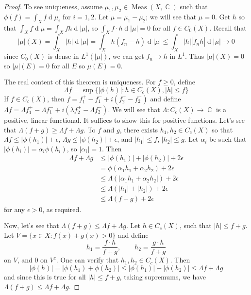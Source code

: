 \documentclass[12pt, a4paper]{book}
\DeclareMathOperator{\C}{\mathbb{C}}
\DeclareMathOperator{\Meas}{Meas}
\renewcommand{\d}[1]{\ensuremath{\operatorname{d}\!{#1}}} %
\theoremstyle{nonumberplain}
\newtheorem{proof}{Proof}
\begin{document}
\begin{proof}
    To see uniqueness, assume $\mu_1,\mu_2\in\Meas(X,\C)$ such that $\phi(f)=\int_X f\d{\mu_i}$ for $i=1,2$.
    Let $\mu=\mu_1-\mu_2$; we will see that $\mu=0$.
    Get $h$ so that $\int_Xf\d{\mu}=\int_X fh\d{|\mu|}$, so $\int_X f\cdot h\d{|\mu|}=0$ for all $f\in C_0(X)$.
    Recall that
    \[|\mu|(X)=\int_X|h|\d{|\mu|}=\int_X h(f_n-\overline{h})\d{|\mu|}\leq \int_X|h||f_n\overline{h}|\d{|\mu|}\to 0\]
    since $C_0(X)$ is dense in $L^1(|\mu|)$, we can get $f_n\to\overline{h}$ in $L^1$.
    Thus $|\mu|(X)=0$ so $|\mu|(E)=0$ for all $E$ so $\mu(E)=0$.

    The real content of this theorem is uniqueness.
    For $f\geq 0$, define
    \begin{equation*}
        \Lambda f=\sup\{|\phi(h)|:h\in C_c(X),|h|\leq f\}
    \end{equation*}
    If $f\in C_c(X)$, then $f=f_1^+-f_1^-+i(f_2^+-f_2^-)$ and define $\Lambda f=\Lambda f_1^+-\Lambda f_1^-+i\left(\lambda f_2^+-\Lambda f_2^-\right)$.
    We will see that $\Lambda:C_c(X)\to\C$ is a positive, linear functional.
    It suffices to show this for positive functions.
    Let's see that $\Lambda(f+g)\geq\Lambda f+\Lambda g$.
    To $f$ and $g$, there exists $h_1,h_2\in C_c(X)$ so that $\Lambda f\leq|\phi(h_1)|+\epsilon$, $\Lambda g\leq|\phi(h_2)|+\epsilon$, and $|h_1|\leq f$, $|h_2|\leq g$.
    Let $\alpha_i$ be such that $|\phi(h_i)|=\alpha_i\phi(h_i)$, so $|\alpha_i|=1$.
    Then
    \begin{align*}
        \Lambda f+\Lambda g &\leq |\phi(h_1)|+|\phi(h_2)|+2\epsilon\\
                            &= \phi(\alpha_1h_1+\alpha_2h_2)+2\epsilon\\
                            &\leq \Lambda(|\alpha_1h_1+\alpha_2h_2|)+2\epsilon\\
                            &\leq \Lambda(|h_1|+|h_2|)+2\epsilon\\
                            &\leq \Lambda(f+g)+2\epsilon
    \end{align*}
    for any $\epsilon>0$, as required.

    Now, let's see that $\Lambda(f+g)\leq\Lambda f+\Lambda g$.
    Let $h\in C_c(X)$, such that $|h|\leq f+g$.
    Let $V=\{x\in X:f(x)+g(x)>0\}$ and define
    \[h_1=\frac{f\cdot h}{f+g},\qquad h_2=\frac{g\cdot h}{f+g}\]
    on $V$, and $0$ on $V^c$.
    One can verify that $h_1,h_2\in C_c(X)$.
    Then
    \begin{equation*}
        |\phi(h)|=|\phi(h_1)+\phi(h_2)|\leq|\phi(h_1)|+|\phi(h_2)|\leq\Lambda f+\Lambda g
    \end{equation*}
    and since this is true for all $|h|\leq f+g$, taking supremums, we have $\Lambda(f+g)\leq\Lambda f+\Lambda g$.


\end{proof}
\end{document}
